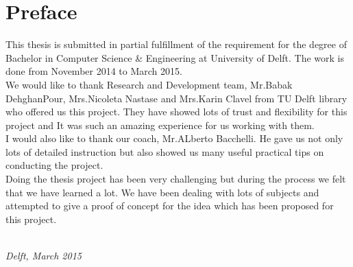 \chapter*{Preface}

This thesis is submitted in partial fulfillment of the requirement for  the degree of Bachelor in Computer Science \& Engineering at University of Delft. The work is done from November 2014 to March 2015.\\

We would like to thank Research and Development team, Mr.Babak DehghanPour, Mrs.Nicoleta Nastase and Mrs.Karin Clavel from TU Delft library who offered us this project. They have showed lots of trust and flexibility for this project and It was such an amazing experience for us working with them.\\

I would also like to thank our coach, Mr.ALberto Bacchelli. He gave us not only lots of detailed instruction but also showed us many useful practical tips on conducting the project.\\

Doing the thesis project has been very challenging but during the process we felt that we have learned a lot. We have been dealing with lots of subjects and attempted to give a proof of concept for the idea which has been proposed for this project.  


\begin{flushright}
{\makeatletter\itshape
    \@author \\
    Delft, March 2015
\makeatother}
\end{flushright}

